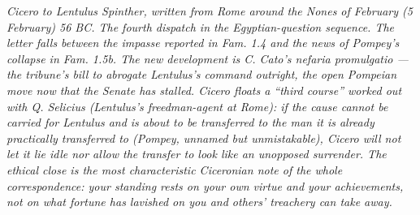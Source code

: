 
\textit{Cicero to Lentulus Spinther, written from Rome around
the Nones of February (5 February) 56 BC. The fourth dispatch
in the Egyptian-question sequence. The letter falls between
the impasse reported in Fam. 1.4 and the news of Pompey's
collapse in Fam. 1.5b. The new development is C. Cato's
\textit{nefaria promulgatio} --- the tribune's bill to abrogate
Lentulus's command outright, the open Pompeian move now that
the Senate has stalled. Cicero floats a ``third course''
worked out with Q. Selicius (Lentulus's freedman-agent at
Rome): if the cause cannot be carried for Lentulus and is
about to be transferred to the man it is already practically
transferred to (Pompey, unnamed but unmistakable), Cicero will
not let it lie idle nor allow the transfer to look like an
unopposed surrender. The ethical close is the most
characteristic Ciceronian note of the whole correspondence:
your standing rests on your own virtue and your achievements,
not on what fortune has lavished on you and others' treachery
can take away.}
